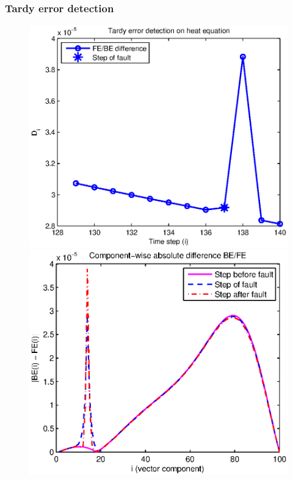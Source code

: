 \documentclass{beamer}
\begin{document}
\begin{frame}
\frametitle{Tardy error detection}

\begin{figure}
  \includegraphics[scale=0.5]{figs/tardy_detection.eps}
  \includegraphics[scale=0.5]{figs/tardy_detection_soln.eps}
\end{figure}

\end{frame}
\end{document}
